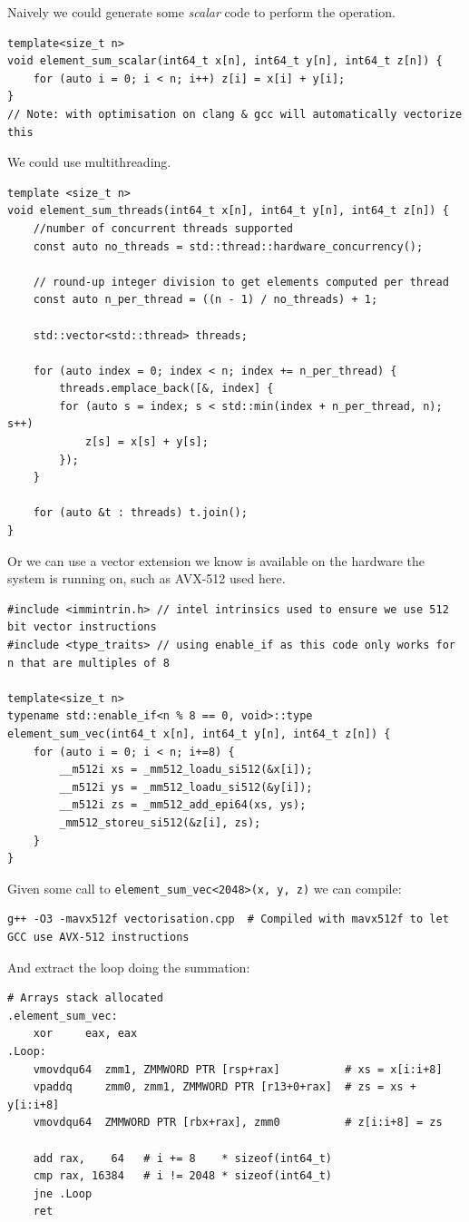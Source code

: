 Naively we could generate some \textit{scalar} code to perform the operation.
\begin{verbatim}
template<size_t n>
void element_sum_scalar(int64_t x[n], int64_t y[n], int64_t z[n]) {
    for (auto i = 0; i < n; i++) z[i] = x[i] + y[i];
}
// Note: with optimisation on clang & gcc will automatically vectorize this
\end{verbatim}
We could use multithreading.
\begin{verbatim}
template <size_t n>
void element_sum_threads(int64_t x[n], int64_t y[n], int64_t z[n]) {
    //number of concurrent threads supported
    const auto no_threads = std::thread::hardware_concurrency();
    
    // round-up integer division to get elements computed per thread
    const auto n_per_thread = ((n - 1) / no_threads) + 1;
    
    std::vector<std::thread> threads;
    
    for (auto index = 0; index < n; index += n_per_thread) {
        threads.emplace_back([&, index] {
        for (auto s = index; s < std::min(index + n_per_thread, n); s++)
            z[s] = x[s] + y[s];
        });
    }

    for (auto &t : threads) t.join();
}
\end{verbatim}
\noindent
Or we can use a vector extension we know is available on the hardware the system is running on, such as AVX-512 used here.
\begin{verbatim}
#include <immintrin.h> // intel intrinsics used to ensure we use 512 bit vector instructions
#include <type_traits> // using enable_if as this code only works for n that are multiples of 8

template<size_t n>
typename std::enable_if<n % 8 == 0, void>::type 
element_sum_vec(int64_t x[n], int64_t y[n], int64_t z[n]) { 
    for (auto i = 0; i < n; i+=8) {
        __m512i xs = _mm512_loadu_si512(&x[i]);
        __m512i ys = _mm512_loadu_si512(&y[i]);
        __m512i zs = _mm512_add_epi64(xs, ys);
        _mm512_storeu_si512(&z[i], zs);
    }
}
\end{verbatim}
Given some call to \texttt{element_sum_vec<2048>(x, y, z)} we can compile:
\begin{verbatim}
g++ -O3 -mavx512f vectorisation.cpp  # Compiled with mavx512f to let GCC use AVX-512 instructions
\end{verbatim}
And extract the loop doing the summation:
\begin{verbatim}
# Arrays stack allocated
.element_sum_vec:
    xor     eax, eax
.Loop:
    vmovdqu64  zmm1, ZMMWORD PTR [rsp+rax]          # xs = x[i:i+8]
    vpaddq     zmm0, zmm1, ZMMWORD PTR [r13+0+rax]  # zs = xs + y[i:i+8]
    vmovdqu64  ZMMWORD PTR [rbx+rax], zmm0          # z[i:i+8] = zs

    add rax,    64   # i += 8    * sizeof(int64_t)
    cmp rax, 16384   # i != 2048 * sizeof(int64_t)
    jne .Loop
    ret
\end{verbatim}

